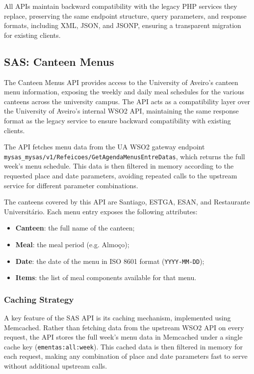 \documentclass[12pt, a4paper]{report}
\begin{document}
All APIs maintain backward compatibility with the legacy PHP services they replace,
preserving the same endpoint structure, query parameters, and response formats,
including XML, JSON, and JSONP, ensuring a transparent migration for existing clients.

\subsection{SAS: Canteen Menus}
The Canteen Menus API provides access to the University of Aveiro's canteen menu information,
exposing the weekly and daily meal schedules for the various canteens across the university
campus. The API acts as a compatibility layer over the University of Aveiro's internal WSO2
API, maintaining the same response format as the legacy service to ensure backward compatibility
with existing clients.

The API fetches menu data from the UA WSO2 gateway endpoint
\texttt{mysas\_mysas/\allowbreak v1/\allowbreak Refeicoes/\allowbreak GetAgendaMenusEntreDatas},
which returns the full week's menu schedule. This data is then filtered in memory according to the
requested place and date parameters, avoiding repeated calls to the upstream service for different
parameter combinations.

The canteens covered by this API are Santiago, ESTGA, ESAN, and Restaurante Universitário.
Each menu entry exposes the following attributes:

\begin{itemize}
      \item \textbf{Canteen}: the full name of the canteen;
      \item \textbf{Meal}: the meal period (e.g. Almoço);
      \item \textbf{Date}: the date of the menu in ISO 8601 format (\texttt{YYYY-MM-DD});
      \item \textbf{Items}: the list of meal components available for that menu.
\end{itemize}

\subsubsection{Caching Strategy}
A key feature of the SAS API is its caching mechanism, implemented using Memcached.
Rather than fetching data from the upstream WSO2 API on every request, the API stores the
full week's menu data in Memcached under a single cache key (\texttt{ementas:all:week}).
This cached data is then filtered in memory for each request, making any combination of
place and date parameters fast to serve without additional upstream calls.
\end{document}
